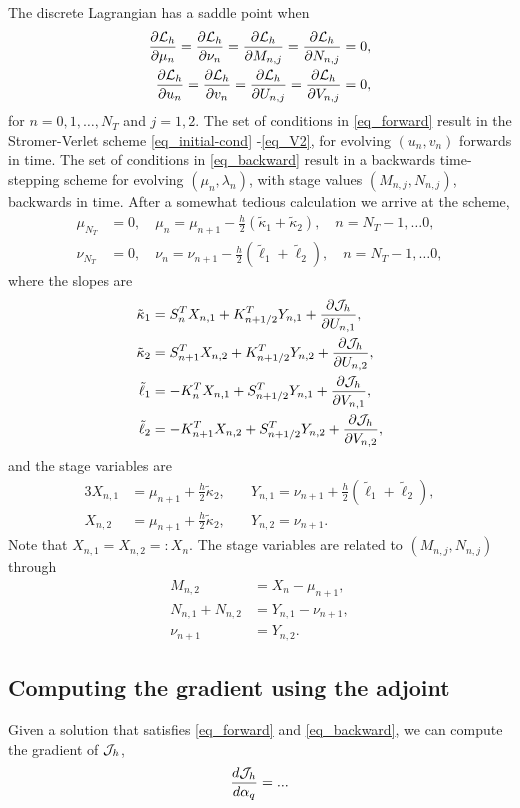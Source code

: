 \documentclass[11pt]{article}
\begin{document}
The discrete Lagrangian has a saddle point when
\begin{align}
  \frac{\partial{\cal L}_h}{\partial \mu_n} =
  \frac{\partial{\cal L}_h}{\partial \nu_n} =
  \frac{\partial{\cal L}_h}{\partial M_{n,j}} =
  \frac{\partial{\cal L}_h}{\partial N_{n,j}} &= 0,\label{eq_forward}\\
  \frac{\partial{\cal L}_h}{\partial u_n} =
  \frac{\partial{\cal L}_h}{\partial v_n} =
  \frac{\partial{\cal L}_h}{\partial U_{n,j}} =
  \frac{\partial{\cal L}_h}{\partial V_{n,j}} &= 0,\label{eq_backward}
\end{align}
for $n=0,1,\ldots,N_T$ and $j=1,2$. The set of conditions in \eqref{eq_forward} result in the
Stromer-Verlet scheme \eqref{eq_initial-cond} -\eqref{eq_V2}, for evolving $(u_n, v_n)$ forwards in
time. The set of conditions in \eqref{eq_backward} result in a backwards time-stepping scheme
for evolving $(\mu_n, \lambda_n)$, with stage values $(M_{n,j}, N_{n,j})$, backwards in time. After a
somewhat tedious calculation we arrive at the scheme,
\begin{align}
  \mu_{N_T} &= 0,\quad \mu_n = \mu_{n+1} - \frac{h}{2} \left(\tilde{\kappa}_1 +
  \tilde{\kappa}_2\right),\quad n=N_T -1, \ldots 0,\\
  \nu_{N_T} &= 0,\quad \nu_{n} = \nu_{n+1} - \frac{h}{2} \left( \tilde{\ell}_1 + \tilde{\ell}_2 \right),\quad n=N_T -1, \ldots 0,
\end{align}
where the slopes are
\begin{align}
\tilde\kappa_1 &= S_n^T X_{n,1} + K_{n+1/2}^T Y_{n,1} + \frac{\partial {\cal J}_h}{\partial U_{n,1}} ,\\
\tilde\kappa_2 &= S_{n+1}^T X_{n,2} + K_{n+1/2}^T Y_{n,2}  + \frac{\partial {\cal J}_h}{\partial U_{n,2}},\\
\tilde\ell_1 &= -K_{n}^T X_{n,1} + S_{n+1/2}^T Y_{n,1}  + \frac{\partial {\cal J}_h}{\partial V_{n,1}},\\
\tilde\ell_2 &= -K_{n+1}^T X_{n,2} + S_{n+1/2}^T Y_{n,2}  + \frac{\partial {\cal J}_h}{\partial V_{n,2}},
\end{align}
and the stage variables are
\begin{alignat}{3}
  X_{n,1} &= \mu_{n+1} + \frac{h}{2} \tilde{\kappa}_{2},\quad
  &Y_{n,1} = \nu_{n+1} +\frac{h}{2} \left( \tilde{\ell}_1 + \tilde{\ell}_2 \right),\\
  X_{n,2} & = \mu_{n+1} + \frac{h}{2} \tilde{\kappa}_{2},\quad
  &Y_{n,2} = \nu_{n+1}.
\end{alignat}
Note that $X_{n,1}=X_{n,2} =: X_n$. The stage variables are related to $(M_{n,j}, N_{n,j})$ through
\begin{align}
  M_{n,2} &= X_{n} - \mu_{n+1},\\
  N_{n,1} + N_{n,2} &= Y_{n,1} - \nu_{n+1},\\
  \nu_{n+1} &= Y_{n,2}.
\end{align}

\subsection{Computing the gradient using the adjoint}

Given a solution that satisfies \eqref{eq_forward} and \eqref{eq_backward}, we can
compute the gradient of ${\cal J}_h$,
\[
\frac{d{\cal J}_h}{d\alpha_q} = ...
\]



\end{document}
